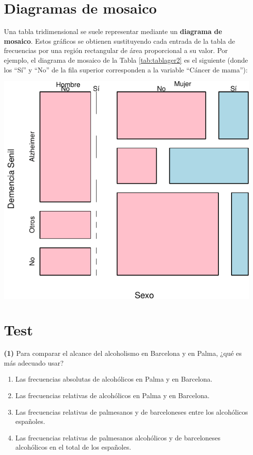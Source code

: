 \documentclass[
]{book}
\providecommand{\tightlist}{%
  \setlength{\itemsep}{0pt}\setlength{\parskip}{0pt}}
\theoremstyle{definition}
\theoremstyle{definition}
\theoremstyle{definition}
\theoremstyle{definition}
\theoremstyle{remark}
\begin{document}
\hypertarget{diagramas-de-mosaico}{%
\section{Diagramas de mosaico}\label{diagramas-de-mosaico}}

Una tabla tridimensional se suele representar mediante un \textbf{diagrama de mosaico}. Estos gráficos se obtienen sustituyendo cada entrada de la tabla de frecuencias por una región rectangular de área proporcional a su valor. Por ejemplo, el diagrama de mosaico de la Tabla \ref{tab:tablager2} es el siguiente (donde los ``Sí'' y ``No'' de la fila superior corresponden a la variable ``Cáncer de mama''):

\begin{center}\includegraphics[width=0.5\linewidth]{INREMDN_files/figure-latex/unnamed-chunk-235-1} \end{center}

\hypertarget{test-5}{%
\section{Test}\label{test-5}}

\textbf{(1)} Para comparar el alcance del alcoholismo en Barcelona y en Palma, ¿qué es más adecuado usar?

\begin{enumerate}
\def\labelenumi{\arabic{enumi}.}
\tightlist
\item
  Las frecuencias absolutas de alcohólicos en Palma y en Barcelona.
\item
  Las frecuencias relativas de alcohólicos en Palma y en Barcelona.
\item
  Las frecuencias relativas de palmesanos y de barceloneses entre los alcohólicos españoles.
\item
  Las frecuencias relativas de palmesanos alcohólicos y de barceloneses alcohólicos en el total de los españoles.
\end{enumerate}
\end{document}

